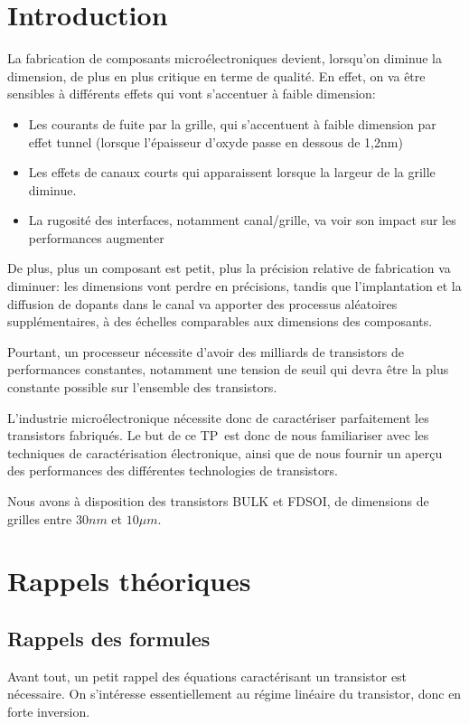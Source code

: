 \documentclass[a4paper,11pt]{report}
\begin{document}


\chapter*{Introduction}
La fabrication de composants microélectroniques devient, lorsqu'on diminue la dimension, de plus en plus critique en terme de qualité. En effet, on va être sensibles à différents effets qui vont s'accentuer à faible dimension:
\begin{itemize}
    \item Les courants de fuite par la grille, qui s'accentuent à faible dimension par effet tunnel (lorsque l'épaisseur d'oxyde passe en dessous de 1,2nm)
    \item Les effets de canaux courts qui apparaissent lorsque la largeur de la grille diminue.
    \item La rugosité des interfaces, notamment canal/grille, va voir son impact sur les performances augmenter
\end{itemize}

De plus, plus un composant est petit, plus la précision relative de fabrication va diminuer: les dimensions vont perdre en précisions, tandis que l'implantation et la diffusion de dopants dans le canal va apporter des processus aléatoires supplémentaires, à des échelles comparables aux dimensions des composants.

Pourtant, un processeur nécessite d'avoir des milliards de transistors de performances constantes, notamment une tension de seuil qui devra être la plus constante possible sur l'ensemble des transistors.

L'industrie microélectronique nécessite donc de caractériser parfaitement les transistors fabriqués. Le but de ce TP est donc de nous familiariser avec les techniques de caractérisation électronique, ainsi que de nous fournir un aperçu des performances des différentes technologies de transistors.

Nous avons à disposition des transistors BULK et FDSOI, de dimensions de grilles entre $30nm$ et $10\mu m$.

\chapter{Rappels théoriques}
\section{Rappels des formules}
Avant tout, un petit rappel des équations caractérisant un transistor est nécessaire. On s'intéresse essentiellement au régime linéaire du transistor, donc en forte inversion.
\end{document}
